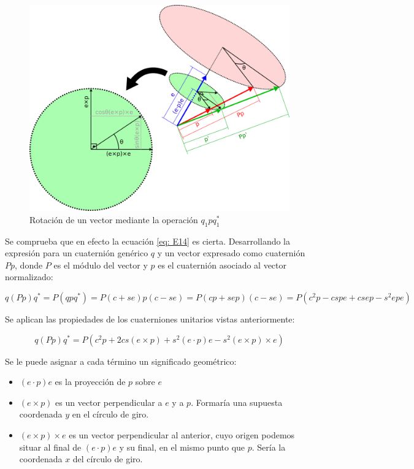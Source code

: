 \documentclass[12pt, a4paper]{report}
\begin{document}
\begin{figure}[h] 
	\centering
		\includegraphics[scale=1.1]{../img/rotation_quaternion.png} 
	\caption{Rotación de un vector mediante la operación $q_1pq_1^*$}
	\label{fig: rot_cuat}
\end{figure}

Se comprueba que en efecto la ecuación \eqref{eq: E14} es cierta. Desarrollando la expresión para un cuaternión genérico $q$ y un vector expresado como cuaternión $Pp$, donde $P$ es el módulo del vector y $p$ es el cuaternión asociado al vector normalizado:

$$ q(Pp)q^* = P(qpq^*) = P(c+se)p(c-se) = P(cp + sep)(c - se) = P(c^2p - cspe + csep - s^2epe) $$

Se aplican las propiedades de los cuaterniones unitarios vistas anteriormente:

\begin{equation} \label{eq: E12} 
q(Pp)q^* = P(c^2p + 2cs(e \times p) + s^2(e \cdot p)e - s^2(e \times p) \times e) 
\end{equation}

Se le puede asignar a cada término un significado geométrico:

\begin{itemize}

\item $(e \cdot p)e$ es la proyección de $p$ sobre $e$
\item $(e \times p)$ es un vector perpendicular a $e$ y a $p$. Formaría una supuesta coordenada $y$ en el círculo de giro.
\item $(e \times p) \times e$ es un vector perpendicular al anterior, cuyo origen podemos situar al final de $(e \cdot p)e$ y su final, en el mismo punto que $p$. Sería la coordenada $x$ del círculo de giro.

\end{itemize}  
\end{document}
